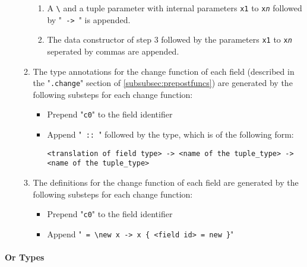 \documentclass{article}
\begin{document}
\begin{itemize}
\begin{enumerate}
\begin{enumerate}
\item
A \verb|\| and a tuple parameter with internal parameters \texttt{x1} to
\texttt{x\textit{n}} followed by "\texttt{ -> }" is appended.

\item
The data constructor of step 3 followed by the parameters \texttt{x1} to
\texttt{x\textit{n}} seperated by commas are appended.

\end{enumerate}

\item
The type annotations for the change function of each field (described in the
"\texttt{.change}" section of \ref{subsubsec:prepostfuncs}) are generated by
the following substeps for each change function:

\begin{itemize}
\item
Prepend "\texttt{c0}" to the field identifier

\item
Append "\verb| :: |" followed by the type, which is of the following form:

\begin{verbatim}
<translation of field type> -> <name of the tuple_type> -> <name of the tuple_type>
\end{verbatim}


\end{itemize}

\item
The definitions for the change function of each field are generated by the
following substeps for each change function:

\begin{itemize}
\item
Prepend "\texttt{c0}" to the field identifier

\item
Append "\verb| = \new x -> x { <field id> = new }|"

\end{itemize}

\end{enumerate}

\end{itemize}

\newpage
\paragraph{Or Types}
\end{document}
